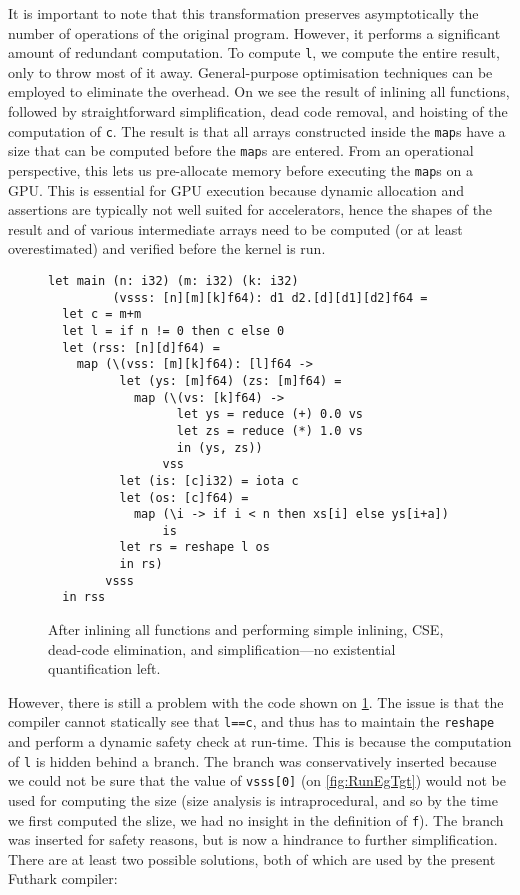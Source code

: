 It is important to note that this transformation preserves
asymptotically the number of operations of the original program.
However, it performs a significant amount of redundant computation.
To compute \lstinline{l}, we compute the entire result, only to throw
most of it away.  General-purpose optimisation techniques can be
employed to eliminate the overhead.  On
 we see the result of inlining all
functions, followed by straightforward simplification, dead code
removal, and hoisting of the computation of \lstinline{c}.  The result
is that all arrays constructed inside the \lstinline{map}s have a size
that can be computed before the \lstinline{map}s are entered.  From an
operational perspective, this lets us pre-allocate memory before
executing the \lstinline{map}s on a GPU.  This is essential for GPU
execution because dynamic allocation and assertions are typically not
well suited for accelerators, hence the shapes of the result and of
various intermediate arrays need to be computed (or at least
overestimated) and verified before the kernel is run.

\begin{figure}
\begin{lstlisting}[xleftmargin=0pt]
let main (n: i32) (m: i32) (k: i32)
         (vsss: [n][m][k]f64): d1 d2.[d][d1][d2]f64 =
  let c = m+m
  let l = if n != 0 then c else 0
  let (rss: [n][d]f64) =
    map (\(vss: [m][k]f64): [l]f64 ->
          let (ys: [m]f64) (zs: [m]f64) =
            map (\(vs: [k]f64) ->
                  let ys = reduce (+) 0.0 vs
                  let zs = reduce (*) 1.0 vs
                  in (ys, zs))
                vss
          let (is: [c]i32) = iota c
          let (os: [c]f64) =
            map (\i -> if i < n then xs[i] else ys[i+a])
                is
          let rs = reshape l os
          in rs)
        vsss
  in rss
\end{lstlisting}

  \caption{After inlining all functions and performing simple
    inlining, CSE, dead-code elimination, and simplification---no
    existential quantification left.}
\label{fig:SimplifyFShape}
\end{figure}

However, there is still a problem with the code shown on
\cref{fig:SimplifyFShape}.  The issue is that the compiler cannot
statically see that \lstinline{l==c}, and thus has to maintain the
\lstinline{reshape} and perform a dynamic safety check at run-time.
This is because the computation of \lstinline{l} is hidden behind a
branch.  The branch was conservatively inserted because we could not
be sure that the value of \lstinline{vsss[0]} (on \cref{fig:RunEgTgt})
would not be used for computing the size (size analysis is
intraprocedural, and so by the time we first computed the slize, we
had no insight in the definition of \lstinline{f}).  The branch was
inserted for safety reasons, but is now a hindrance to further
simplification.  There are at least two possible solutions, both of
which are used by the present Futhark compiler:

